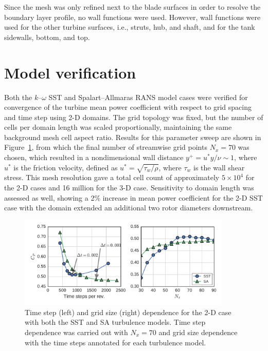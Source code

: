 \documentclass[aip,graphicx]{revtex4-1}
\begin{document}
Since the mesh was only refined next to the blade surfaces in order to resolve
the boundary layer profile, no wall functions were used. However, wall functions
were used for the other turbine surfaces, i.e., struts, hub, and shaft, and for
the tank sidewalls, bottom, and top.


\section{Model verification}

Both the $k$--$\omega$ SST and Spalart--Allmaras RANS model cases were verified
for convergence of the turbine mean power coefficient with respect to grid
spacing and time step using 2-D domains. The grid topology was fixed, but the
number of cells per domain length was scaled proportionally, maintaining the
same background mesh cell aspect ratio. Results for this parameter sweep are
shown in Figure~\ref{fig:2d-br-verification}, from which the final number of
streamwise grid points $N_x = 70$ was chosen, which resulted in a nondimensional
wall distance $y^+ = u^* y / \nu \sim 1$, where $u^*$ is the friction velocity,
defined as $u^*=\sqrt{\tau_w / \rho}$, where $\tau_w$ is the wall shear stress.
This mesh resolution gave a total cell count of approximately $5 \times 10^4$
for the 2-D cases and 16 million for the 3-D case. Sensitivity to domain length
was assessed as well, showing a 2\% increase in mean power coefficient for the
2-D SST case with the domain extended an additional two rotor diameters
downstream.

\begin{figure}
    \centering

    \includegraphics[width=0.9\textwidth]{verification}

    \caption{Time step (left) and grid size (right) dependence for the 2-D case
    with both the SST and SA turbulence models. Time step dependence was carried
    out with $N_x=70$ and grid size dependence with the time steps annotated for
    each turbulence model.}

    \label{fig:2d-br-verification}
\end{figure}
\end{document}
